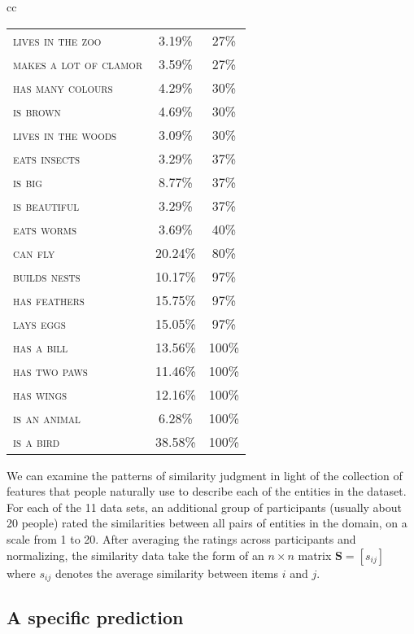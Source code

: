 \documentclass{apa}
\newcommand{\mat}[1]{\mathbf{#1}}
\newcommand{\feature}[1]{\textsc{#1}}
\begin{document}
\begin{table}
\begin{center}
\begin{tabular}{cc}
\begin{tabular}{lcc}
\feature{lives in the zoo	} &   	3.19\% & 27\% \\
\feature{makes a lot of clamor} &	3.59\% & 27\% \\
\feature{has many colours}  &  	4.29\% & 30\% \\
\feature{is brown	} &  			4.69\% & 30\% \\
\feature{lives in the woods}	&   3.09\% & 30\% \\
\feature{eats insects}  &  		3.29\% & 37\% \\
\feature{is big}	  &  			8.77\% & 37\% \\
\feature{is beautiful}&    		3.29\% & 37\% \\
\feature{eats worms}	&    		3.69\% & 40\% \\
\feature{can fly}	  &  			20.24\% & 80\% \\
\feature{builds nests}&    		10.17\% & 97\% \\
\feature{has feathers	}&    		15.75\% & 97\% \\
\feature{lays eggs}	&    		15.05\% & 97\% \\
\feature{has a bill}	 &   		13.56\% & 100\% \\
\feature{has two paws}	&   		11.46\% & 100\% \\
\feature{has wings}	  &  		12.16\% &  100\% \\
\feature{is an animal}  &  		6.28\% & 100\% \\
\feature{is a bird}	  &  		38.58\% & 100\% \\
\hline
\end{tabular}

\end{tabular}
\normalsize
\end{center}
\end{table}


We can examine the patterns of similarity judgment in light of the collection of features that people naturally use to describe each of the entities in the dataset. For each of the 11 data sets, an additional group of participants (usually about 20 people) rated the similarities between all pairs of entities in the domain, on a scale from 1 to 20. After averaging the ratings across participants and normalizing, the similarity data take the form of an $n \times n$ matrix $\mat{S}=[s_{ij}]$ where $s_{ij}$ denotes the average similarity between items $i$ and $j$.

\subsection{A specific prediction}
\end{document}
